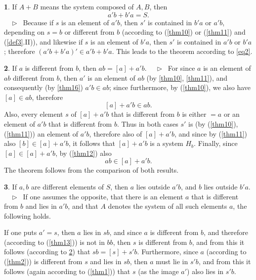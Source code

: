 \documentclass[leqno,hidelinks,a4paper]{article}
\theoremstyle{definition}
\newtheorem{satz}{\protect\satzname}
\newcommand{\satzname}{}
\renewcommand{\satzname}{\hspace{-4pt}.\ Satz}%
\renewcommand{\satzname}{\hspace{-4pt}.\ Theorem}%
\newcommand\Beweis{\medskip \newline $ \phantom{'.'} \rhd \ $}%
\newcommand{\partof}{\in}
\begin{document}
\begin{paracol}{2}
\begin{satz}\label{thm17}
If $A + B$ means the system composed of $A, B$, then
\[
	a'b + b'a = S.
\]
\vspace*{-16pt}%
\Beweis
Because if $s$ is an element of $a'b$, then $s'$ is contained in $b'a$ or $a'b$,
depending on $s = b$ or different from $b$ (according to (\ref{thm10}) or
(\ref{thm11}) and (\ref{def3}.II)), and likewise if $s$ is an element of $b'a$,
then $s'$ is contained in $a'b$ or $b'a$; therefore $(a'b + b'a)' \partof a'b + b'a$.
This leads to the theorem according to \eqref{eq2}.
\end{satz}

\begin{satz}\label{thm18}
If $a$ is different from $b$, then $ab = [a] + a'b$.
\Beweis
For since $a$ is an element of $ab$ different from $b$, then $a'$ is an element
of $ab$ (by \ref{thm10}, \ref{thm11}), and consequently (by \ref{thm16})
$a'b \partof ab$; since furthermore, by (\ref{thm10}), we also have $[a]
\partof ab$, therefore
\[
	[a] + a'b \partof ab.
\]
Also, every element $s$ of $[a] + a'b$ that is different from $b$ is either
$= a$ or an element of $a'b$ that is different from $b$. Thus in both cases $s'$
is (by (\ref{thm10}), (\ref{thm11})) an element of $a'b$, therefore also of
$[a]+ a'b$, and since by (\ref{thm11}) also $[b] \partof [a] + a'b$, it follows
that $[a] + a'b$ is a system $H_b$. Finally, since $[a] \partof [a] + a'b$, by
(\ref{thm12}) also
\[
	ab \partof [a] + a' b.
\]
The theorem follows from the comparison of both results.
\end{satz}

\newpage

\begin{satz}\label{thm19}
If $a, b$ are different elements of $S$, then $a$ lies outside $a'b$, and $b$ lies
outside $b'a$.
\Beweis
If one assumes the opposite, that there is an element $a$ that is different from
$b$ and lies in $a'b$, and that $A$ denotes the system of all such elements $a$,
the following holds.

If one puts $a'=s$, then $a$ lies in $sb$, and since $a$ is different from $b$,
and therefore (according to (\ref{thm13})) is not in $bb$, then $s$ is different
from $b$, and from this it follows (according to \ref{thm18}) that $sb = [s] + s'b$.
Furthermore, since $a$ (according to (\ref{thm2})) is different from $s$ and lies
in $sb$, then $a$ must lie in $s'b$, and from this it follows (again according to
(\ref{thm1})) that $s$ (as the image $a'$) also lies in $s'b$.%


\end{satz}
\end{paracol}
\end{document}
